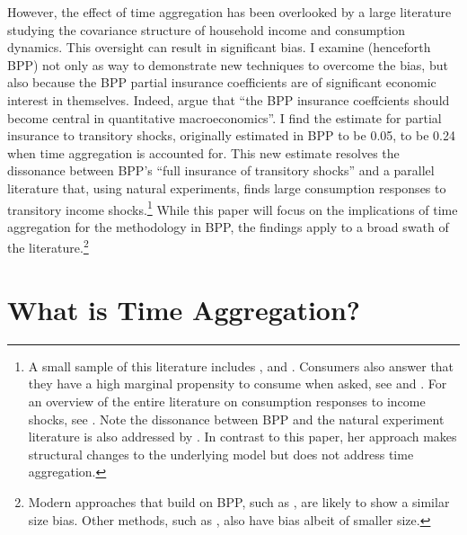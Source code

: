 \documentclass[AER]{AEA}
\begin{document}
However, the effect of time aggregation has been overlooked by a large literature studying the covariance structure of household income and consumption dynamics. This oversight can result in significant bias. I examine \cite{blundell_consumption_2008} (henceforth BPP) not only as way to demonstrate new techniques to overcome the bias, but also because the BPP partial insurance coefficients are of significant economic interest in themselves. Indeed, \cite{kaplan_how_2010} argue that ``the BPP insurance coeffcients should become central in quantitative macroeconomics''. I find the estimate for partial insurance to transitory shocks, originally estimated in BPP to be 0.05, to be 0.24 when time aggregation is accounted for. This new estimate resolves the dissonance between BPP's ``full insurance of transitory shocks'' and  a parallel literature that, using natural experiments, finds large consumption responses to transitory income shocks.\footnote{A small sample of this literature includes \cite{parker_consumer_2013}, \cite{agarwal_consumption_2014} and \cite{Sahmetal:2008TaxRebates}. Consumers also answer that they have a high marginal propensity to consume when asked, see \cite{fuster_what_2018} and \cite{jappelli_fiscal_2014}. For an overview of the entire literature on consumption responses to income shocks, see \cite{jappelli_consumption_2010}. Note the dissonance between BPP and the natural experiment literature is also addressed by \cite{commault_how_2017}. In contrast to this paper, her approach makes structural changes to the underlying model but does not address time aggregation.} While this paper will focus on the implications of time aggregation for the methodology in BPP, the findings apply to a broad swath of the literature.\footnote{Modern approaches that build on BPP, such as \cite{arellano_earnings_2017}, are likely to show a similar size bias. Other methods, such as \cite{carroll_nature_1997}, also have bias albeit of smaller size.}


\section{What is Time Aggregation?}
\end{document}
